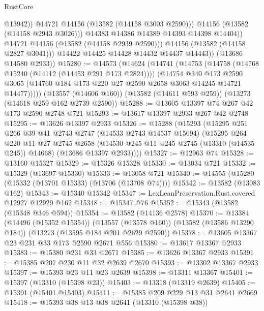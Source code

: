 \begin{lexlean}{RustCore}
\begin{coremodule}
                          @13942))
                      @14721
                      @14156
                      (@13582 (@14158 @3003 @2590)))
                    @14156
                    (@13582 (@14158 @2943 @3026)))
                  @14383
                  @14386
                  @14389
                  @14393
                  @14398
                  @14404))
              @14721
              @14156
              (@13582 (@14158 @2939 @2590)))
            @14156
            (@13582 (@14158 @2827 @3041)))
          @14422
          @14425
          @14428
          @14432
          @14437
          @14443))
      (@13686 @14580 @2933))
@15280 := @14573
    (@14624
      (@14741
        (@14753
          (@14758 (@14768 @15240 (@14112 (@14453 @291 @173 @2824))))
          (@14754
            @340
            @173
            @2590
            @3065
            (@14760 @184 @173 @220 @27 @2590 @2658 @3063 @14245 @14721 @14477)))))
    (@13557 (@14606 @160))
    (@13582 (@14611 @593 @259))
    (@13273 (@14618 @259 @162 @2739 @2590))
@15288 := @13605 @13397 @74 @267 @42 @173 @2590 @2748 @721
@15293 := @13617 @13397 @2933 @267 @42 @2748
@15295 := @13626 @13397 @2933
@15326 := @15288
    (@15293
      (@15295
        @251
        @266
        @39
        @41
        @2743
        @2747
        (@14533 @2743 @14537 @15094)
        (@15295
          @264
          @220
          @11
          @27
          @2745
          @2658
          (@14530 @245 @11 @245 @2745 (@13310 (@14535 @245)) @14668)
          (@13686 @13397 @2933))))
@15327 := @12963 @74
@15328 := @13160 @15327
@15329 := @15326 @15328
@15330 := @13034 @721
@15332 := @15329 (@13697 @15330)
@15333 := @13058 @721
@15340 := @14555 (@15280 (@15332 (@13701 @15333) (@13706 (@13708 @74))))
@15342 := @13582 (@13083 @162)
@15343 := @15340 @15342
@15347 := LexLeanPreservation.Rust.covered @12927 @12929 @162
@15348 := @15347 @76
@15352 := @15343 (@13582 (@15348 @346 @594))
@15354 := @13582 (@14136 @2578)
@15370 := @13384
    (@14496 (@15352 @15354))
    (@13557 (@13578 @160))
    (@13582 (@13586 @13290 @184))
    (@13273 (@13595 @184 @201 @2629 @2590))
@15378 := @13605 @13367 @23 @231 @33 @173 @2590 @2671 @556
@15380 := @13617 @13367 @2933
@15383 := @15380 @231 @33 @2671
@15385 := @13626 @13367 @2933
@15391 := @15385 @207 @230 @11 @32 @2639 @2670
@15393 := @13302 @13367 @2933
@15397 := @15393 @23 @11 @23 @2639
@15398 := @13311 @13367
@15401 := @15397 (@13310 (@15398 @23))
@15403 := @13318 (@13319 @2639)
@15405 := @15391 (@15401 @15403)
@15411 := @15385 @209 @229 @13 @31 @2641 @2669
@15418 := @15393 @38 @13 @38 @2641 (@13310 (@15398 @38))

\end{coremodule}
\end{lexlean}
